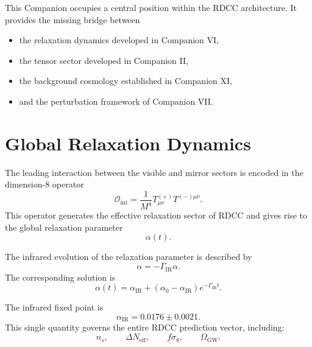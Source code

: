 \documentclass[11pt,a4paper]{article}
\begin{document}
This Companion occupies a central position within the RDCC architecture. It
provides the missing bridge between
\begin{itemize}
  \item the relaxation dynamics developed in Companion VI,
  \item the tensor sector developed in Companion II,
  \item the background cosmology established in Companion XI,
  \item and the perturbation framework of Companion VII.
\end{itemize}

\section{Global Relaxation Dynamics}

The leading interaction between the visible and mirror sectors is encoded in the
dimension-8 operator
\begin{equation}
  \mathcal{O}_{\mathrm{int}}
  =
  \frac{1}{M^4}
  T_{\mu\nu}^{(+)} T^{(-)\mu\nu}.
\end{equation}
This operator generates the effective relaxation sector of RDCC and gives rise
to the global relaxation parameter
\begin{equation}
  \alpha(t).
\end{equation}

The infrared evolution of the relaxation parameter is described by
\begin{equation}
  \dot{\alpha}
  =
  -
  \Gamma_{\mathrm{IR}}
  \alpha.
\end{equation}
The corresponding solution is
\begin{equation}
  \alpha(t)
  =
  \alpha_{\mathrm{IR}}
  +
  \left(
    \alpha_0 - \alpha_{\mathrm{IR}}
  \right)
  e^{-\Gamma_{\mathrm{IR}} t}.
\end{equation}

The infrared fixed point is
\begin{equation}
  \alpha_{\mathrm{IR}}
  =
  0.0176 \pm 0.0021.
\end{equation}
This single quantity governs the entire RDCC prediction vector, including:
\begin{equation}
  n_s,
  \qquad
  \Delta N_{\mathrm{eff}},
  \qquad
  f\sigma_8,
  \qquad
  \Omega_{\mathrm{GW}}.
\end{equation}
\end{document}
